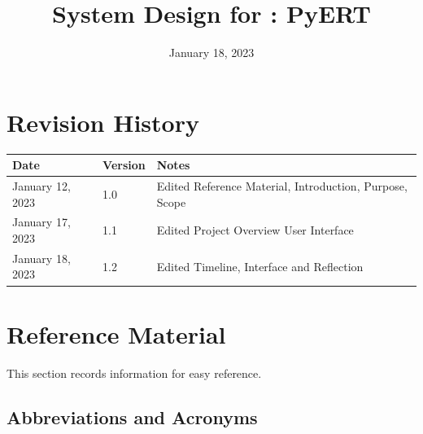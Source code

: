 \documentclass[12pt, titlepage]{article}
\begin{document}
\title{System Design for \progname{}: PyERT} 
\author{\authname}
\date{January 18, 2023}

\maketitle


\section{Revision History}

\begin{tabularx}{\textwidth}{p{3cm}p{2cm}X}
\toprule {\bf Date} & {\bf Version} & {\bf Notes}\\
\midrule
January 12, 2023 & 1.0 & Edited Reference Material, Introduction, Purpose, Scope\\
January 17, 2023 & 1.1 & Edited Project Overview User Interface\\
January 18, 2023 & 1.2 & Edited Timeline, Interface and Reflection\\
\bottomrule
\end{tabularx}

\newpage

\section{Reference Material}

This section records information for easy reference.

\subsection{Abbreviations and Acronyms}
\end{document}
